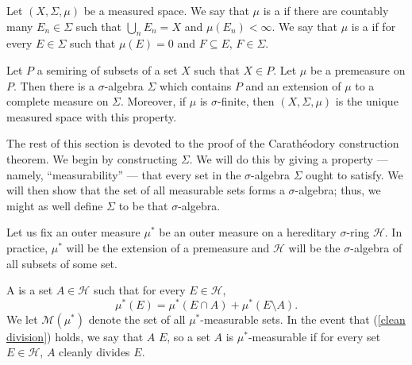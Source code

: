 \begin{definition}
Let $(X, \Sigma, \mu)$ be a measured space.
We say that $\mu$ is a  if there are countably many $E_{n} \in \Sigma$ such that $\bigcup_{n} E_{n} = X$ and $\mu(E_{n}) < \infty$.
We say that $\mu$ is a  if for every $E \in \Sigma$ such that $\mu(E) = 0$ and $F \subseteq E$, $F \in \Sigma$.
\end{definition}

\begin{theorem}
Let $P$ a semiring of subsets of a set $X$ such that $X \in P$.
Let $\mu$ be a premeasure on $P$.
Then there is a $\sigma$-algebra $\Sigma$ which contains $P$ and an extension of $\mu$ to a complete measure on $\Sigma$.
Moreover, if $\mu$ is $\sigma$-finite, then $(X, \Sigma, \mu)$ is the unique measured space with this property.
\end{theorem}

\begin{subsec}
The rest of this section is devoted to the proof of the Carathéodory construction theorem.
We begin by constructing $\Sigma$.
We will do this by giving a property --- namely, ``measurability'' --- that every set in the $\sigma$-algebra $\Sigma$ ought to satisfy.
We will then show that the set of all measurable sets forms a $\sigma$-algebra; thus, we might as well define $\Sigma$ to be that $\sigma$-algebra.
\end{subsec}

\begin{subsec}
Let us fix an outer measure $\mu^{*}$ be an outer measure on a hereditary $\sigma$-ring $\mathcal H$.
In practice, $\mu^{*}$ will be the extension of a premeasure and $\mathcal H$ will be the $\sigma$-algebra of all subsets of some set.
\end{subsec}

\begin{definition}
A  is a set $A \in \mathcal H$ such that for every $E \in \mathcal H$,
\begin{equation}\label{clean division}
\mu^{*}(E) = \mu^{*}(E \cap A) + \mu^{*}(E \setminus A).
\end{equation}
We let $\mathcal M(\mu^{*})$ denote the set of all $\mu^{*}$-measurable sets.
In the event that (\ref{clean division}) holds, we say that $A$  $E$, so a set $A$ is $\mu^{*}$-measurable if for every set $E \in \mathcal H$, $A$ cleanly divides $E$.
\end{definition}

